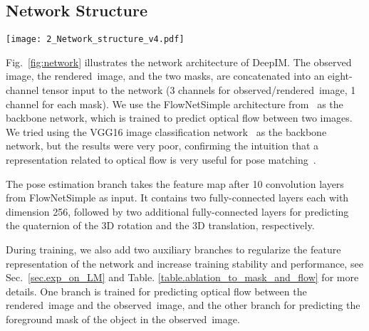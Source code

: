 \documentclass[twocolumn]{svjour3}
\newcommand{\dimnet}[0]{DeepIM}
\newcommand{\rend}[0]{rendered}
\newcommand{\real}[0]{observed}
\newcommand{\yi}[1]{#1}
\begin{document}
\subsection{Network Structure}
\label{sec.network_structure}
\begin{figure*}[t]
	\centering
	\texttt{[image: 2\_Network\_structure\_v4.pdf]}
	\caption{{\dimnet\ uses a FlowNetSimple backbone to predict a relative SE(3) transformation to match the observed and \rend\ image of an object. \yi{Taking observed image and rendered image and their corresponding masks as input, the convolution layers output a feature map which then be forwarded through several fully connected layers to predict the translation and rotation. The same feature map, combined with feature maps in the previous layers, will also be used to predict flow and foreground mask during training.}}}
	\label{fig:network}
    
\end{figure*}

Fig.~\ref{fig:network} illustrates the network architecture of \dimnet. 
The observed image, the \rend\ image, and the two masks, are concatenated into an eight-channel tensor input to the network (3 channels for \real/\rend\ image, 1 channel for each mask). 
We use the FlowNetSimple architecture from~\cite{dosovitskiy2015flownet} as the backbone network, which is trained to predict optical flow between two images.
We tried using the VGG16 image classification network~\citep{simonyan2014very} as the backbone network, but the results were very poor, confirming the intuition that a representation related to optical flow is very useful for pose matching\yi{~\citep{wang2017deepvo}}.

The pose estimation branch takes the feature map after 10 convolution layers from FlowNetSimple as input. It contains two fully-connected layers each with dimension 256, followed by two additional fully-connected layers for predicting the quaternion of the 3D rotation and the 3D translation, respectively. 

During training, we also add two auxiliary branches to regularize the feature representation of the network and increase training stability \yi{and performance, see Sec.~\ref{sec.exp_on_LM} and Table. \ref{table.ablation_to_mask_and_flow} for more details}. One branch is trained for predicting optical flow between the \rend\ image and the \real\ image, and the other branch for predicting the foreground mask of the object in the \real\ image. 
\end{document}

